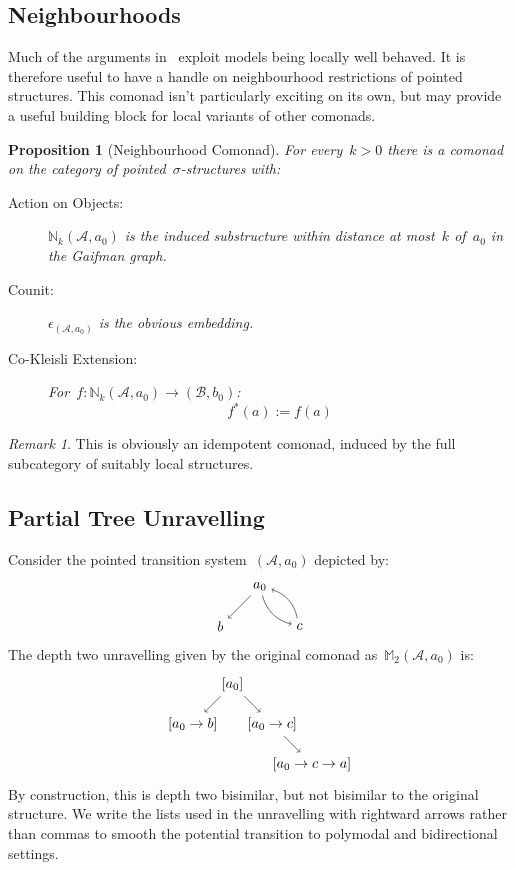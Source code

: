 \documentclass{article}
\theoremstyle{plain}
\newtheorem{proposition}[theorem]{Proposition}
\theoremstyle{definition}
\theoremstyle{remark}
\newtheorem{remark}[theorem]{Remark}
\numberwithin{theorem}{section}
\newcommand{\As}{\mathcal{A}}
\newcommand{\Aso}{(\As, a_0)}
\newcommand{\Bs}{\mathcal{B}}
\newcommand{\Bso}{(\Bs, b_0)}
\newcommand{\sg}{\sigma}
\newcommand{\M}{\mathbb{M}}
\newcommand{\N}{\mathbb{N}}
\newcommand{\Nk}{\N_{k}}
\begin{document}
\subsection{Neighbourhoods}
Much of the arguments in~\cite{Otto2004} exploit models being locally well behaved. It is therefore useful to have a handle on neighbourhood restrictions of pointed structures. This comonad isn't particularly exciting on its own, but may provide a useful building block for local variants of other comonads.

\begin{proposition}[Neighbourhood Comonad]
For every~$k > 0$ there is a comonad on the category of pointed~$\sg$-structures with:
\begin{description}
\item[Action on Objects:] $\Nk\Aso$ is the induced substructure within distance at most~$k$ of~$a_0$ in the Gaifman graph.
\item[Counit:] $\epsilon_{\Aso}$ is the obvious embedding.
\item[Co-Kleisli Extension:] For~$f : \Nk\Aso \rightarrow \Bso$:
\begin{equation*}
    f^*(a) := f(a)
\end{equation*}
\end{description}
\end{proposition}
\begin{remark}
This is obviously an idempotent comonad, induced by the full subcategory of suitably local structures.
\end{remark}

\subsection{Partial Tree Unravelling}
Consider the pointed transition system~$\Aso$ depicted by:
\begin{equation}
    \begin{tikzpicture}
    \path 
    node (a) {$a_0$} +(-1,-1) 
    node (b) {$b$} +(1,-1) 
    node (c) {$c$};
    \path 
    (a) edge[->] (b) 
    (a) edge[->, bend right] (c)
    (c) edge[->, bend right] (a);
    \end{tikzpicture}
\end{equation}
The depth two unravelling given by the original comonad as~$\M_{2}\Aso$ is:
\begin{equation*}
    \begin{tikzpicture}
    \path 
    node (a) {$[a_0]$} +(-1,-1) 
    node (b) {$[a_0 \rightarrow b]$} ++(1,-1) 
    node (c) {$[a_0 \rightarrow c]$} ++(1,-1) 
    node (a') {$[a_0 \rightarrow c \rightarrow a]$};
    
    \path 
    (a) edge[->] (b) 
    (a) edge[->] (c)
    (c) edge[->] (a');
    \end{tikzpicture}
\end{equation*}
By construction, this is depth two bisimilar, but not bisimilar to the original structure. We write the lists used in the unravelling with rightward arrows rather than commas to smooth the potential transition to polymodal and bidirectional settings.
\end{document}
